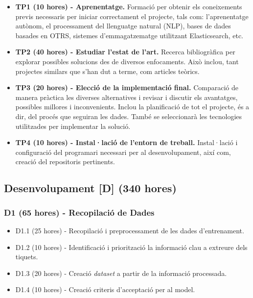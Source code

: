 \begin{itemize}
    \item \textbf{TP1 (10 hores) - Aprenentatge.}
        Formació per obtenir els coneixements previs necessaris per iniciar correctament el projecte, tals com: l'aprenentatge autònom, el processament del llenguatge natural (NLP), bases de dades basades en OTRS, sistemes d'emmagatzematge utilitzant Elasticsearch, etc.
    
    \item \textbf{TP2 (40 hores) - Estudiar l'estat de l'art.}
        Recerca bibliogràfica per explorar possibles solucions des de diversos enfocaments. Això inclou, tant projectes similars que s'han dut a terme, com articles teòrics.
    
    \item \textbf{TP3 (20 hores) - Elecció de la implementació final.}
        Comparació de manera pràctica les diverses alternatives i revisar i discutir els avantatges, possibles millores i inconvenients. Inclou la planificació de tot el projecte, és a dir, del procés que seguiran les dades. També se seleccionarà les tecnologies utilitzades per implementar la solució.
        
    \item \textbf{TP4 (10 hores) - Instal·lació de l'entorn de treball.}
        Instal·lació i configuració del programari necessari per al desenvolupament, així com, creació del repositoris pertinents.
\end{itemize}


\subsection{Desenvolupament [D] (340 hores)}

\subsubsection{D1 (65 hores) - Recopilació de Dades}
\begin{itemize}
    \item D1.1 (25 hores) - Recopilació i preprocessament de les dades d'entrenament.
    \item D1.2 (10 hores) - Identificació i priorització la informació clau a extreure dels tiquets.
    \item D1.3 (20 hores) - Creació \textit{dataset} a partir de la informació processada.
    \item D1.4 (10 hores) - Creació criteris d'acceptació per al model.
\end{itemize}

